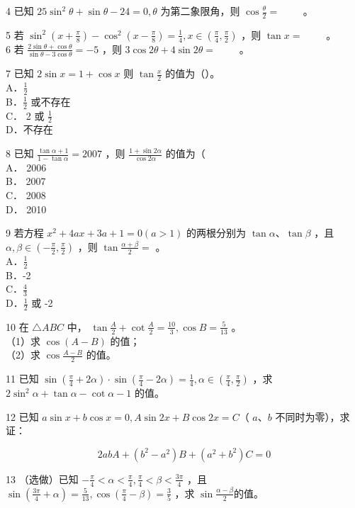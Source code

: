 \documentclass[10pt]{article}
\begin{document}
4 已知 \(25 \sin ^{2} \theta+\sin \theta-24=0, \theta\) 为第二象限角，则 \(\cos \frac{\theta}{2}=\) \(\qquad\)。

5 若 \(\sin ^{2}\left(x+\frac{\pi}{8}\right)-\cos ^{2}\left(x-\frac{\pi}{8}\right)=\frac{1}{4}, x \in\left(\frac{\pi}{4}, \frac{\pi}{2}\right)\) ，则 \(\tan x=\) \(\qquad\)。\\
6 若 \(\frac{2 \sin \theta+\cos \theta}{\sin \theta-3 \cos \theta}=-5\) ，则 \(3 \cos 2 \theta+4 \sin 2 \theta=\) \(\qquad\)。

7 已知 \(2 \sin x=1+\cos x\) 则 \(\tan \frac{x}{2}\) 的值为（）。\\
A．\(\frac{1}{2}\)\\
B．\(\frac{1}{2}\) 或不存在\\
C． 2 或 \(\frac{1}{2}\)\\
D．不存在

8 已知 \(\frac{\tan \alpha+1}{1-\tan \alpha}=2007\) ，则 \(\frac{1+\sin 2 \alpha}{\cos 2 \alpha}\) 的值为（\\
A． 2006\\
B． 2007\\
C． 2008\\
D． 2010

9 若方程 \(x^{2}+4 a x+3 a+1=0(a>1)\) 的两根分别为 \(\tan \alpha 、 \tan \beta\) ，且 \(\alpha, \beta \in\left(-\frac{\pi}{2}, \frac{\pi}{2}\right)\) ，则 \(\tan \frac{\alpha+\beta}{2}=\) 。\\
A．\(\frac{1}{2}\)\\
B．-2\\
C．\(\frac{4}{3}\)\\
D．\(\frac{1}{2}\) 或 -2

10 在 \(\triangle A B C\) 中， \(\tan \frac{A}{2}+\cot \frac{A}{2}=\frac{10}{3}, \cos B=\frac{5}{13}\) 。\\
（1）求 \(\cos (A-B)\) 的值；\\
（2）求 \(\cos \frac{A-B}{2}\) 的值。

11 已知 \(\sin \left(\frac{\pi}{4}+2 \alpha\right) \cdot \sin \left(\frac{\pi}{4}-2 \alpha\right)=\frac{1}{4}, \alpha \in\left(\frac{\pi}{4}, \frac{\pi}{2}\right)\) ，求 \(2 \sin ^{2} \alpha+\tan \alpha-\cot \alpha-1\) 的值。

12 已知 \(a \sin x+b \cos x=0, A \sin 2 x+B \cos 2 x=C\)（ \(a 、 b\) 不同时为零），求证：

\[
2 a b A+\left(b^{2}-a^{2}\right) B+\left(a^{2}+b^{2}\right) C=0
\]

13 （选做）已知 \(-\frac{\pi}{4}<\alpha<\frac{\pi}{4}, \frac{\pi}{4}<\beta<\frac{3 \pi}{4}\) ，且 \(\sin \left(\frac{3 \pi}{4}+\alpha\right)=\frac{5}{13}, \cos \left(\frac{\pi}{4}-\beta\right)=\frac{3}{5}\) ，求 \(\sin \frac{\alpha-\beta}{2}\)的值。
\end{document}
